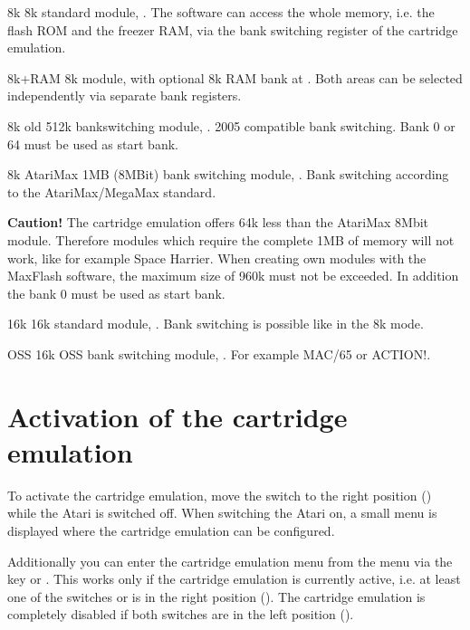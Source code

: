 \begin{fcmdlist}
\item[8k]
8k standard module, .\newline
The software can access the whole memory, i.e. the flash ROM and the freezer
RAM, via the bank switching register of the cartridge emulation.
\item[8k+RAM]
8k module, \newline
with optional 8k RAM bank at . Both areas can be selected independently 
via separate bank registers.
\item[8k old]
512k bankswitching module, .\newline
\frz{} 2005 compatible bank switching.\newline
Bank 0 or 64 must be used as start bank.
\item[8k AtariMax]
1MB (8MBit) bank switching module, .\newline
Bank switching according to the AtariMax/MegaMax standard. \newline

\textbf{Caution!} The cartridge emulation offers 64k less than the
AtariMax 8Mbit module. Therefore modules which require the complete 1MB of
memory will not work, like for example Space Harrier. When creating own modules
with the MaxFlash software, the maximum size of 960k must not be exceeded. In
addition the bank 0 must be used as start bank.

\item[16k]
16k standard module, .\newline
Bank switching is possible like in the 8k mode.
\item[OSS]
16k OSS bank switching module, .\newline
For example MAC/65 or ACTION!.


\end{fcmdlist}

\section{Activation of the cartridge emulation}
To activate the cartridge emulation, move the  switch to the right
position () while the Atari is switched off. When switching the
Atari on, a small menu is displayed where the cartridge emulation can be
configured.

Additionally you can enter the cartridge emulation menu from the\linebreak
\frz
menu via the key  or . This works only if the cartridge
emulation is currently active, i.e. at least one of the switches 
or  is in the right position (). The cartridge emulation is
completely disabled if both switches are in the left position ().

